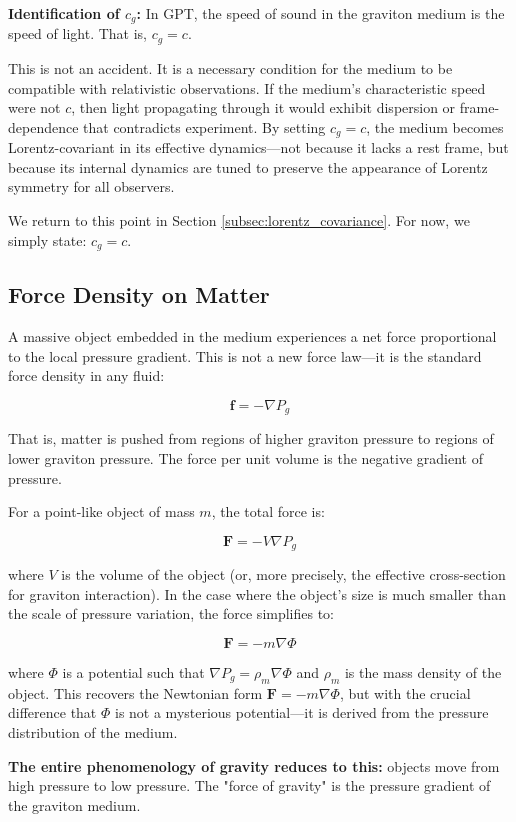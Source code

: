 \documentclass[12pt, a4paper]{article}
\begin{document}
\textbf{Identification of \( c_g \):} In GPT, the speed of sound in the graviton medium is the speed of light. That is, \( c_g = c \).

This is not an accident. It is a necessary condition for the medium to be compatible with relativistic observations. If the medium's characteristic speed were not \( c \), then light propagating through it would exhibit dispersion or frame-dependence that contradicts experiment. By setting \( c_g = c \), the medium becomes Lorentz-covariant in its effective dynamics—not because it lacks a rest frame, but because its internal dynamics are tuned to preserve the appearance of Lorentz symmetry for all observers.

We return to this point in Section \ref{subsec:lorentz_covariance}. For now, we simply state: \( c_g = c \).

\subsection{Force Density on Matter}
\label{subsec:force_density}

A massive object embedded in the medium experiences a net force proportional to the local pressure gradient. This is not a new force law—it is the standard force density in any fluid:

\[
\mathbf{f} = -\nabla P_g
\]

That is, matter is pushed from regions of higher graviton pressure to regions of lower graviton pressure. The force per unit volume is the negative gradient of pressure.

For a point-like object of mass \( m \), the total force is:

\[
\mathbf{F} = -V \nabla P_g
\]

where \( V \) is the volume of the object (or, more precisely, the effective cross-section for graviton interaction). In the case where the object's size is much smaller than the scale of pressure variation, the force simplifies to:

\[
\mathbf{F} = -m \nabla \Phi
\]

where \( \Phi \) is a potential such that \( \nabla P_g = \rho_m \nabla \Phi \) and \( \rho_m \) is the mass density of the object. This recovers the Newtonian form \( \mathbf{F} = -m \nabla \Phi \), but with the crucial difference that \( \Phi \) is not a mysterious potential—it is derived from the pressure distribution of the medium.

\textbf{The entire phenomenology of gravity reduces to this:} objects move from high pressure to low pressure. The "force of gravity" is the pressure gradient of the graviton medium.
\end{document}

